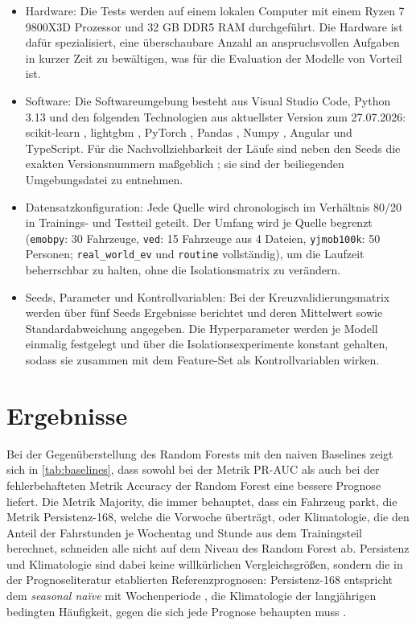 \begin{itemize}

    \item Hardware: Die Tests werden auf einem lokalen Computer mit einem Ryzen 7 9800X3D Prozessor und 32 GB DDR5 RAM durchgeführt. Die Hardware ist dafür spezialisiert, eine überschaubare Anzahl an anspruchsvollen Aufgaben in kurzer Zeit zu bewältigen, was für die Evaluation der Modelle von Vorteil ist.
    \item Software: Die Softwareumgebung besteht aus Visual Studio Code, Python 3.13 und den folgenden Technologien aus aktuellster Version zum 27.07.2026: scikit-learn \parencite{pedregosa2011sklearn}, lightgbm \parencite{ke2017lightgbm}, PyTorch \parencite{paszke2019pytorch}, Pandas \parencite{mckinney2010pandas}, Numpy \parencite{harris2020numpy}, Angular und TypeScript. Für die Nachvollziehbarkeit der Läufe sind neben den Seeds die exakten Versionsnummern maßgeblich \parencite{pineau2021reproducibility}; sie sind der beiliegenden Umgebungsdatei zu entnehmen.
    \item Datensatzkonfiguration: Jede Quelle wird chronologisch im Verhältnis 80/20 in Trainings- und Testteil geteilt. Der Umfang wird je Quelle begrenzt (\texttt{emobpy}: 30 Fahrzeuge, \texttt{ved}: 15 Fahrzeuge aus 4 Dateien, \texttt{yjmob100k}: 50 Personen; \texttt{real\_world\_ev} und \texttt{routine} vollständig), um die Laufzeit beherrschbar zu halten, ohne die Isolationsmatrix zu verändern.
    \item Seeds, Parameter und Kontrollvariablen: Bei der Kreuzvalidierungsmatrix werden über fünf Seeds Ergebnisse berichtet und deren Mittelwert sowie Standardabweichung angegeben. Die Hyperparameter werden je Modell einmalig festgelegt und über die Isolationsexperimente konstant gehalten, sodass sie zusammen mit dem Feature-Set als Kontrollvariablen wirken.
\end{itemize}

\section{Ergebnisse}
\label{sec:ergebnisse}

Bei der Gegenüberstellung des Random Forests mit den naiven Baselines zeigt sich in \cref{tab:baselines}, dass sowohl bei der Metrik PR-AUC als auch bei der fehlerbehafteten Metrik Accuracy der Random Forest eine bessere Prognose liefert. Die Metrik Majority, die immer behauptet, dass ein Fahrzeug parkt, die Metrik Persistenz-168, welche die Vorwoche überträgt, oder Klimatologie, die den Anteil der Fahrstunden je Wochentag und Stunde aus dem Trainingsteil berechnet, schneiden alle nicht auf dem Niveau des Random Forest ab. Persistenz und Klimatologie sind dabei keine willkürlichen Vergleichsgrößen, sondern die in der Prognoseliteratur etablierten Referenzprognosen: Persistenz-168 entspricht dem \emph{seasonal naïve} mit Wochenperiode \parencite[Kap. 5.2]{hyndman2021forecasting}, die Klimatologie der langjährigen bedingten Häufigkeit, gegen die sich jede Prognose behaupten muss \parencite{murphy1993good}.


